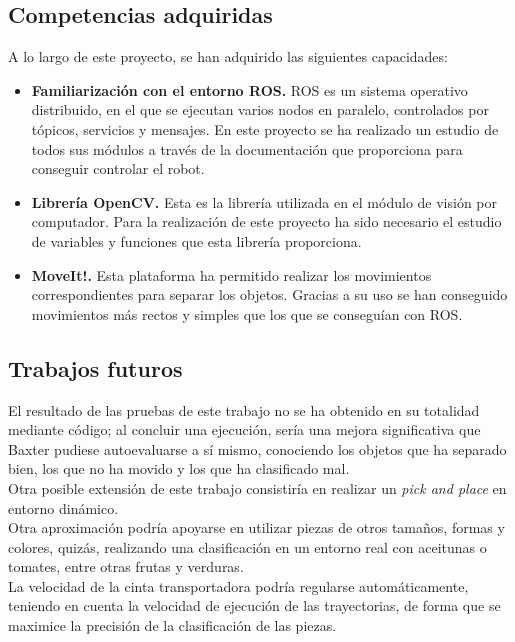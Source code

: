 \subsection{Competencias adquiridas}
\noindent A lo largo de este proyecto, se han adquirido las siguientes capacidades:

\begin{itemize}
	\item \textbf{Familiarización con el entorno ROS.} ROS es un sistema operativo distribuido, en el que se ejecutan varios nodos en paralelo, controlados por tópicos, servicios y mensajes. En este proyecto se ha realizado un estudio de todos sus módulos a través de la documentación que proporciona para conseguir controlar el robot.
	\item \textbf{Librería OpenCV.} Esta es la librería utilizada en el módulo de visión por computador. Para la realización de este proyecto ha sido necesario el estudio de variables y funciones que esta librería proporciona.
	\item \textbf{MoveIt!.} Esta plataforma ha permitido realizar los movimientos correspondientes para separar los objetos. Gracias a su uso se han conseguido movimientos más rectos y simples que los que se conseguían con ROS. \\
\end{itemize}

\subsection{Trabajos futuros}
\noindent El resultado de las pruebas de este trabajo no se ha obtenido en su totalidad mediante código; al concluir una ejecución, sería una mejora significativa que Baxter pudiese autoevaluarse a sí mismo, conociendo los objetos que ha separado bien, los que no ha movido y los que ha clasificado mal. \\

\noindent Otra posible extensión de este trabajo consistiría en realizar un \textit{pick and place} en entorno dinámico. \\

\noindent Otra aproximación podría apoyarse en utilizar piezas de otros tamaños, formas y colores, quizás, realizando una clasificación en un entorno real con aceitunas o tomates, entre otras frutas y verduras. \\

\noindent La velocidad de la cinta transportadora podría regularse automáticamente, teniendo en cuenta la velocidad de ejecución de las trayectorias, de forma que se maximice la precisión de la clasificación de las piezas. \\
